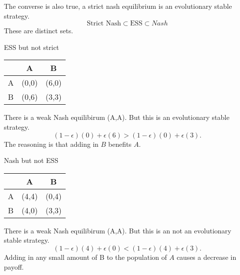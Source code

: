 The converse is also true, a strict nash equilibrium is an evolutionary stable strategy. \[
\textrm{Strict Nash} \subset \textrm{ESS} \subset {Nash}
\]
These are distinct sets.\begin{aexample}{ESS but not strict}{}
    \begin{center}
        \begin{tabular}{|c|c c|} 
            \hline &A& B \\
            
            \hline
            A&(0,0)&(6,0)\\
            \hline B&(0,6)&(3,3)
            \\ \hline
        \end{tabular}
    \end{center}
    There is a weak Nash equilibirum (A,A). But this is an evolutionary stable strategy. \[
    (1-\epsilon)(0)+\epsilon(6)> (1-\epsilon)(0) + \epsilon(3).
    \]
    The reasoning is that adding in $B$ benefits $A$.
\end{aexample}
\begin{aexample}{Nash but not ESS}{}
    \begin{center}
        \begin{tabular}{|c|c c|} 
            \hline &A& B \\
            
            \hline
            A&(4,4)&(0,4)\\
            \hline B&(4,0)&(3,3)
            \\ \hline
        \end{tabular}
    \end{center}
    There is a weak Nash equilibirum (A,A). But this is an not an evolutionary stable strategy. \[
    (1-\epsilon)(4)+\epsilon(0)<(1-\epsilon)(4) + \epsilon(3).
    \]
    Adding in any small amount of B to the population of $A$ causes a decrease in payoff.
\end{aexample}

